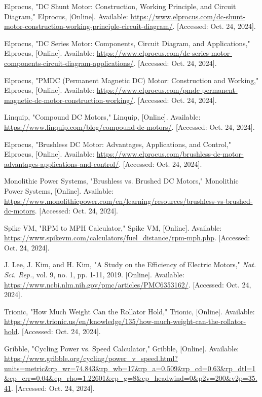 \begin{thebibliography}{45}
	 Elprocus, "DC Shunt Motor: Construction, Working Principle, and Circuit Diagram," Elprocus, [Online]. Available: \url{https://www.elprocus.com/dc-shunt-motor-construction-working-principle-circuit-diagram/}. [Accessed: Oct. 24, 2024]. 
	
	 Elprocus, "DC Series Motor: Components, Circuit Diagram, and Applications," Elprocus, [Online]. Available: \url{https://www.elprocus.com/dc-series-motor-components-circuit-diagram-applications/}. [Accessed: Oct. 24, 2024]. 
	
	 Elprocus, "PMDC (Permanent Magnetic DC) Motor: Construction and Working," Elprocus, [Online]. Available: \url{https://www.elprocus.com/pmdc-permanent-magnetic-dc-motor-construction-working/}. [Accessed: Oct. 24, 2024]. 
	
	 Linquip, "Compound DC Motors," Linquip, [Online]. Available: \url{https://www.linquip.com/blog/compound-dc-motors/}. [Accessed: Oct. 24, 2024]. 
	
	 Elprocus, "Brushless DC Motor: Advantages, Applications, and Control," Elprocus, [Online]. Available: \url{https://www.elprocus.com/brushless-dc-motor-advantages-applications-and-control/}. [Accessed: Oct. 24, 2024]. 
	
	 Monolithic Power Systems, "Brushless vs. Brushed DC Motors," Monolithic Power Systems, [Online]. Available: \url{https://www.monolithicpower.com/en/learning/resources/brushless-vs-brushed-dc-motors}. [Accessed: Oct. 24, 2024].
	
	Spike VM, "RPM to MPH Calculator," Spike VM, [Online]. Available: \url{https://www.spikevm.com/calculators/fuel_distance/rpm-mph.php}. [Accessed: Oct. 24, 2024]. 
	
	J. Lee, J. Kim, and H. Kim, "A Study on the Efficiency of Electric Motors," \textit{Nat. Sci. Rep.}, vol. 9, no. 1, pp. 1-11, 2019. [Online]. Available: \url{https://www.ncbi.nlm.nih.gov/pmc/articles/PMC6353162/}. [Accessed: Oct. 24, 2024]. 
	
	Trionic, "How Much Weight Can the Rollator Hold," Trionic, [Online]. Available: \url{https://www.trionic.us/en/knowledge/135/how-much-weight-can-the-rollator-hold}. [Accessed: Oct. 24, 2024]. 
	
	Gribble, "Cycling Power vs. Speed Calculator," Gribble, [Online]. Available: \url{https://www.gribble.org/cycling/power_v_speed.html?units=metric&rp_wr=74.843&rp_wb=17&rp_a=0.509&rp_cd=0.63&rp_dtl=1&ep_crr=0.04&ep_rho=1.22601&ep_g=8&ep_headwind=0&p2v=200&v2p=35.41}. [Accessed: Oct. 24, 2024]. 
	

\end{thebibliography}
